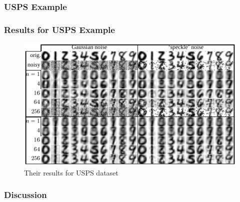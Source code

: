 \documentclass{beamer}
\begin{document}
\begin{frame}
    \frametitle{USPS Example}
\end{frame}

\begin{frame}
    \frametitle{Results for USPS Example}
    \begin{figure}
    \includegraphics[width=\textwidth]{images/paper-usps}
        \caption*{Their results for USPS dataset}
    \end{figure}

\end{frame}

\begin{frame}
    \frametitle{Discussion}
\end{frame}
\end{document}
